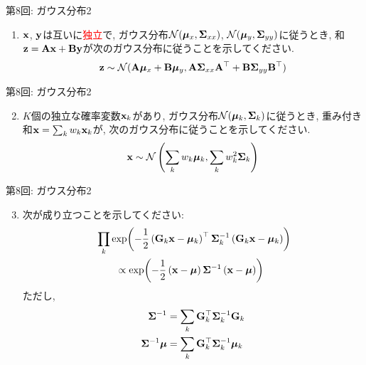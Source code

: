 \documentclass[dvipdfmx,notheorems,t]{beamer}
\begin{document}
\begin{frame}{第8回: ガウス分布2}
\begin{enumerate}
  \item $\vb{x}$, $\vb{y}$は互いに\textcolor{red}{独立}で,
  ガウス分布$\mathcal{N}(\vb*{\mu}_x, \vb{\Sigma}_{xx})$,
  $\mathcal{N}(\vb*{\mu}_y, \vb{\Sigma}_{yy})$に従うとき,
  和$\vb{z} = \vb{A} \vb{x} + \vb{B} \vb{y}$が次のガウス分布に従うことを示してください.
  \begin{align*}
    \vb{z} \sim \mathcal{N}(\vb{A} \vb*{\mu}_x + \vb{B} \vb*{\mu}_y,
      \vb{A} \vb{\Sigma}_{xx} \vb{A}^\top + \vb{B} \vb{\Sigma}_{yy} \vb{B}^\top)
  \end{align*}
\end{enumerate}
\end{frame}

\begin{frame}{第8回: ガウス分布2}
\begin{enumerate}
  \setcounter{enumi}{1}
  \item $K$個の独立な確率変数$\vb{x}_k$があり, ガウス分布$\mathcal{N}(\vb*{\mu}_k, \vb{\Sigma}_k)$に従うとき,
  重み付き和$\vb{x} = \sum_k w_k \vb{x}_k$が, 次のガウス分布に従うことを示してください.
  \begin{align*}
    \vb{x} \sim \mathcal{N} \left( \sum_k w_k \vb*{\mu}_k, \sum_k w_k^2 \vb{\Sigma}_k \right)
  \end{align*}
\end{enumerate}
\end{frame}

\begin{frame}{第8回: ガウス分布2}
\begin{enumerate}
  \setcounter{enumi}{2}
  \item 次が成り立つことを示してください:
  \begin{align*}
    & \prod_k \exp(-\frac{1}{2} \left( \vb{G}_k \vb{x} - \vb*{\mu}_k \right)^\top
      \vb{\Sigma}_k^{-1} \left( \vb{G}_k \vb{x} - \vb*{\mu}_k \right)) \\
    & \qquad \propto \exp(-\frac{1}{2} \left( \vb{x} - \vb*{\mu} \right) \vb{\Sigma}^{-1}
      \left( \vb{x} - \vb*{\mu} \right))
  \end{align*}
  ただし,
  \begin{align*}
    \vb{\Sigma}^{-1} &= \sum_k \vb{G}_k^\top \vb{\Sigma}_k^{-1} \vb{G}_k \\
    \vb{\Sigma}^{-1} \vb*{\mu} &= \sum_k \vb{G}_k^\top \vb{\Sigma}_k^{-1} \vb*{\mu}_k
  \end{align*}
\end{enumerate}
\end{frame}
\end{document}
